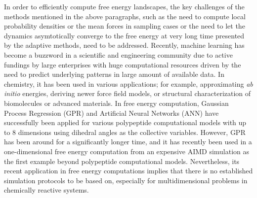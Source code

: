 \begin{spacing}{2.0}
    In order to efficiently compute free energy landscapes, the key challenges of the methods mentioned in the above paragraphs, such as the need to 
    compute local probability densities or the mean forces in sampling cases or the need to let the dynamics asymtotically converge to the free energy 
    at very long time presented by the adaptive methods, need to be addressed. Recently, machine learning has become a buzzword in a scientific and 
    engineering community due to active fundings by large enterprises with huge computational resources driven by the need to predict underlying 
    patterns in large amount of available data. In chemistry, it has been used in various applications; for example, approximating \textsl{ab initio} energies, 
    deriving newer force field models, \cite{P-JPhysChemLett-2017-v8-Kolb,P-PhysRevB-2017-v95-Glielmo} or structural characterization of biomolecules 
    or advanced materials. \cite{P-SoftMatter-2016-v12-Long,P-NatComm-2016-v7-Xue,P-JChemInfModel-2017-v57-Khuntawee} In free energy computation, Gaussian 
    Process Regression (GPR) and Artificial Neural Networks (ANN) have successfully been applied for various polypeptide computational models with 
    up to 8 dimensions using dihedral angles as the collective variables. \cite{P-JCTC-2014-v10-Stecher,P-JCTC-2016-v12-Mones,P-JCTC-2017-v13-Galvelis} 
    However, GPR has been around for a significantly longer time, and it has recently been used in a one-dimensional free energy computation from an 
    expensive AIMD simulation as the first example beyond polypeptide \cite{P-PhysRevLett-2016-v117-Stecher}
    computational models. Nevertheless, its recent application in free energy computations implies that there is no established simulation protocols 
    to be based on, especially for multidimensional problems in chemically reactive systems.


\end{spacing}
